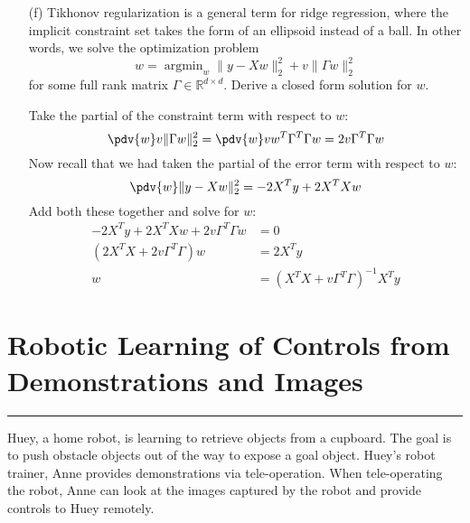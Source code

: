 \documentclass{article}
\begin{document}
\begin{itemize}
        \item [(f)] Tikhonov regularization is a general term for ridge regression, where the implicit constraint set takes the form of an ellipsoid instead of a ball. In other words, we solve the optimization problem
            \begin{equation*}
                w = \mathop{argmin}_{w} \lVert y - Xw \rVert^{2}_{2} + v\lVert \Gamma w \rVert^{2}_{2}
            \end{equation*}
        for some full rank matrix $\Gamma \in \mathbb{R}^{d \times d}$. Derive a closed form solution for $w$.
            \begin{answer}
                Take the partial of the constraint term with respect to $w$:
                    \begin{equation*}
                        \pdv{w} v \lVert \Gamma w \rVert^{2}_{2} = \pdv{w} v w^{T}\Gamma^{T}\Gamma w = 2v\Gamma^{T}\Gamma w
                    \end{equation*}
                Now recall that we had taken the partial of the error term with respect to $w$:
                    \begin{equation*}
                        \pdv{w} \lVert y - Xw \rVert_{2}^{2} = -2X^{T}y + 2X^{T}Xw
                    \end{equation*}
                Add both these together and solve for $w$:
                    \begin{align*}
                        -2X^{T}y + 2X^{T}Xw + 2v\Gamma^{T}\Gamma w &= 0                                       \\
                        (2X^{T}X + 2v\Gamma^{T}\Gamma)w            &= 2X^{T}y                                 \\
                        w                                          &= (X^{T}X + v\Gamma^{T}\Gamma)^{-1}X^{T}y   
                    \end{align*}
            \end{answer}
    \end{itemize}

\newpage
\section*{Robotic Learning of Controls from Demonstrations and Images}
\hrule

Huey, a home robot, is learning to retrieve objects from a cupboard. The goal is to push obstacle objects out of the way to expose a goal object. Huey's robot trainer, Anne provides demonstrations via tele-operation. When tele-operating the robot, Anne can look at the images captured by the robot and provide controls to Huey remotely.
\end{document}
